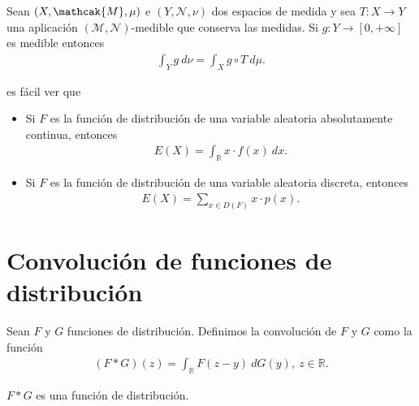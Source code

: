 \begin{teo}
Sean $(X, \mathcak{M}, \mu)$ e $(Y, \mathcal{N},\nu)$ dos espacios de medida y sea $T: X \longrightarrow Y$ una aplicación $(\mathcal{M},\mathcal{N})$-medible que conserva las medidas. Si $g: Y \longrightarrow [0,+\infty]$ es medible entonces
\begin{align*}
    \int_{Y}{g \ d\nu} = \int_{X}{g \circ T \ d\mu}.
\end{align*}
\end{teo}
es fácil ver que 
\begin{itemize}
    \item Si $F$ es la función de distribución de una variable aleatoria absolutamente continua, entonces
    \begin{align*}
        E(X) = \int_{\mathbb{R}} x \cdot f(x) \ dx.
    \end{align*}
    \item Si $F$ es la función de distribución de una variable aleatoria discreta, entonces
    \begin{align*}
        E(X) = \sum_{x \in D(F)} x \cdot p(x).
    \end{align*}
\end{itemize}

\section{Convolución de funciones de distribución}

\begin{defi}
    Sean $F$ y $G$ funciones de distribución. Definimos la convolución de $F$ y $G$ como la función
    \begin{align*}
        (F*G)(z) = \int_{\mathbb{R}} F(z-y) \ dG(y), \ z \in \mathbb{R}.
    \end{align*}
\end{defi}

\begin{prop}
    $F*G$ es una función de distribución.
\end{prop}

